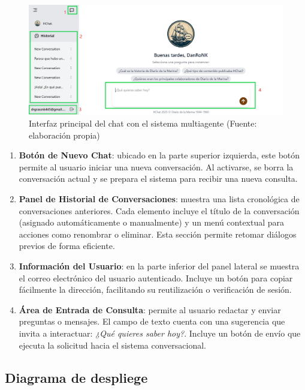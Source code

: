 \begin{figure}[h!]
	\centering
	\includegraphics[width=1\textwidth]{images/interfaz1.png}
	\caption{Interfaz principal del chat con el sistema multiagente (Fuente: elaboración propia)}
	\label{fig:interfaz}
\end{figure}

\begin{enumerate}[label=\textbf{\arabic*.}]
	\item \textbf{Botón de Nuevo Chat}: ubicado en la parte superior izquierda, este botón permite al usuario iniciar una nueva conversación. Al activarse, se borra la conversación actual y se prepara el sistema para recibir una nueva consulta.
	
	\item \textbf{Panel de Historial de Conversaciones}: muestra una lista cronológica de conversaciones anteriores. Cada elemento incluye el título de la conversación (asignado automáticamente o manualmente) y un menú contextual para acciones como renombrar o eliminar. Esta sección permite retomar diálogos previos de forma eficiente.
	
	\item \textbf{Información del Usuario}: en la parte inferior del panel lateral se muestra el correo electrónico del usuario autenticado. Incluye un botón para copiar fácilmente la dirección, facilitando su reutilización o verificación de sesión.
	
	\item \textbf{Área de Entrada de Consulta}: permite al usuario redactar y enviar preguntas o mensajes. El campo de texto cuenta con una sugerencia que invita a interactuar: \textit{¿Qué quieres saber hoy?}. Incluye un botón de envío que ejecuta la solicitud hacia el sistema conversacional.
	
\end{enumerate}

\subsection{Diagrama de despliege}


